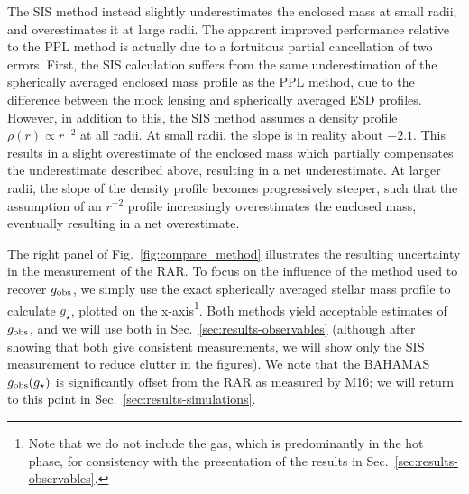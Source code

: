 \documentclass[usenatbib]{mnras}
\newcommand{\dex}{\, {\rm dex}}
\begin{document}
The SIS method instead slightly underestimates the enclosed mass at small radii, and overestimates it at large radii. The apparent improved performance relative to the PPL method is actually due to a fortuitous partial cancellation of two errors. First, the SIS calculation suffers from the same underestimation of the spherically averaged enclosed mass profile as the PPL method, due to the difference between the mock lensing and spherically averaged ESD profiles. However, in addition to this, the SIS method assumes a density profile $\rho(r)\propto r^{-2}$ at all radii. At small radii, the slope is in reality about $-2.1$. This results in a slight overestimate of the enclosed mass which partially compensates the underestimate described above, resulting in a net underestimate. At larger radii, the slope of the density profile becomes progressively steeper, such that the assumption of an $r^{-2}$ profile increasingly overestimates the enclosed mass, eventually resulting in a net overestimate.

The right panel of Fig.~\ref{fig:compare_method} illustrates the resulting uncertainty in the measurement of the RAR. To focus on the influence of the method used to recover $g_{\rm obs}$, we simply use the exact spherically averaged stellar mass profile to calculate $g_\star$, plotted on the x-axis\footnote{Note that we do not include the gas, which is predominantly in the hot phase, for consistency with the presentation of the results in Sec.~\ref{sec:results-observables}.}. Both methods yield acceptable estimates of $g_{\rm obs}$, and we will use both in Sec.~\ref{sec:results-observables} (although after showing that both give consistent measurements, we will show only the SIS measurement to reduce clutter in the figures). We note that the BAHAMAS $g_{\rm obs}(g_\star)$ is significantly offset from the RAR as measured by M16; we will return to this point in Sec.~\ref{sec:results-simulations}.

\end{document}
